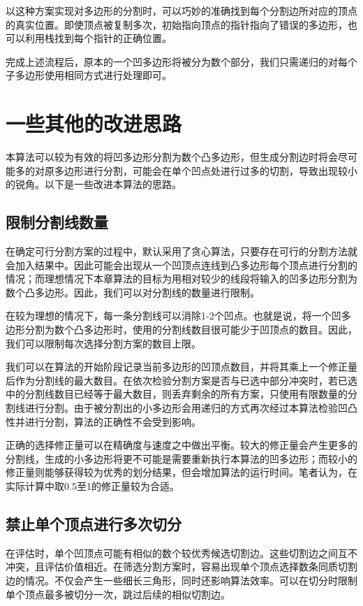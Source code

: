 以这种方案实现对多边形的分割时，可以巧妙的准确找到每个分割边所对应的顶点的真实位置。即使顶点被复制多次，初始指向顶点的指针指向了错误的多边形，也可以利用栈找到每个指针的正确位置。

完成上述流程后，原本的一个凹多边形将被分为数个部分，我们只需递归的对每个子多边形使用相同方式进行处理即可。

\section{一些其他的改进思路}
本算法可以较为有效的将凹多边形分割为数个凸多边形，但生成分割边时将会尽可能多的对原多边形进行分割，可能会在单个凹点处进行过多的切割，导致出现较小的锐角。以下是一些改进本算法的思路。

\subsection{限制分割线数量}
在确定可行分割方案的过程中，默认采用了贪心算法，只要存在可行的分割方法就会加入结果中。因此可能会出现从一个凹顶点连线到凸多边形每个顶点进行分割的情况；而理想情况下本章算法的目标为用相对较少的线段将输入的凹多边形分割为数个凸多边形。因此，我们可以对分割线的数量进行限制。

在较为理想的情况下，每一条分割线可以消除1-2个凹点。也就是说，将一个凹多边形分割为数个凸多边形时，使用的分割线数目很可能少于凹顶点的数目。因此，我们可以限制每次选择分割方案的数目上限。

我们可以在算法的开始阶段记录当前多边形的凹顶点数目，并将其乘上一个修正量后作为分割线的最大数目。在依次检验分割方案是否与已选中部分冲突时，若已选中的分割线数目已经等于最大数目，则丢弃剩余的所有方案，只使用有限数量的分割线进行分割。由于被分割出的小多边形会用递归的方式再次经过本算法检验凹凸性并进行分割，算法的正确性不会受到影响。

正确的选择修正量可以在精确度与速度之中做出平衡。较大的修正量会产生更多的分割线，生成的小多边形将更不可能是需要重新执行本算法的凹多边形；而较小的修正量则能够获得较为优秀的划分结果，但会增加算法的运行时间。笔者认为，在实际计算中取0.5至1的修正量较为合适。

\subsection{禁止单个顶点进行多次切分}
在评估时，单个凹顶点可能有相似的数个较优秀候选切割边。这些切割边之间互不冲突，且评估价值相近。在筛选分割方案时，容易出现单个顶点选择数条同质切割边的情况。不仅会产生一些细长三角形，同时还影响算法效率。可以在切分时限制单个顶点最多被切分一次，跳过后续的相似切割边。

